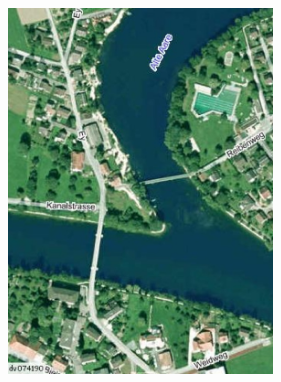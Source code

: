 \documentclass[%
11pt,%
twoside,%
titlepage,%
german,%
headsepline%
]{scrartcl}
\begin{document}
\begin{enumerate}
\begin{center}
\includegraphics[width=7cm]{pictures/ueb27lb}
\end{center}


\end{enumerate}
\end{document}
